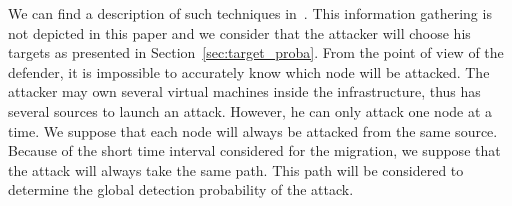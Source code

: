 We can find a description of such techniques in~\cite{Hong2015,Sphinx-Dhawan2015}.
This information gathering is not depicted in this paper and we consider that the attacker will choose his targets as presented in Section~\ref{sec:target_proba}.
From the point of view of the defender, it is impossible to accurately know which node will be attacked.
The attacker may own several virtual machines inside the infrastructure, thus has several sources to launch an attack. However, he can only attack one node at a time. 
We suppose that each node will always be attacked from the same source. 
Because of the short time interval considered for the migration, we suppose that the attack will always take the same path. 
This path will be considered to determine the global detection probability of the attack.
